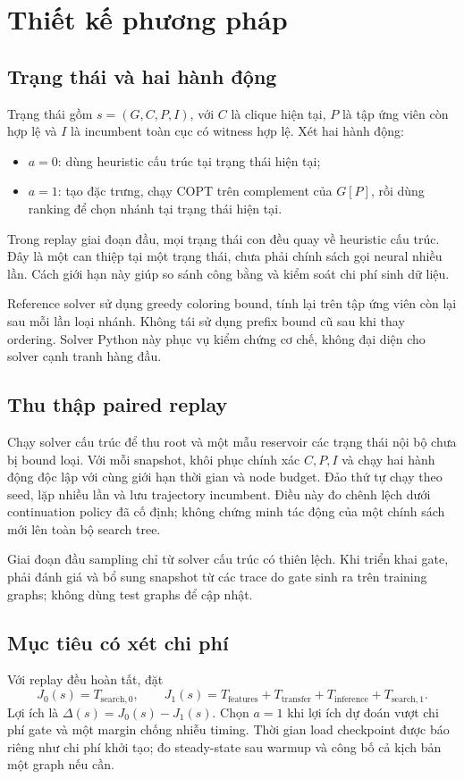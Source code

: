 \documentclass[11pt,a4paper]{article}
\begin{document}
\section{Thiết kế phương pháp}
\subsection{Trạng thái và hai hành động}
Trạng thái gồm $s=(G,C,P,I)$, với $C$ là clique hiện tại, $P$ là tập ứng viên còn hợp lệ và $I$ là incumbent toàn cục có witness hợp lệ. Xét hai hành động:
\begin{itemize}[nosep]
\item $a=0$: dùng heuristic cấu trúc tại trạng thái hiện tại;
\item $a=1$: tạo đặc trưng, chạy COPT trên complement của $G[P]$, rồi dùng ranking để chọn nhánh tại trạng thái hiện tại.
\end{itemize}
Trong replay giai đoạn đầu, mọi trạng thái con đều quay về heuristic cấu trúc. Đây là một can thiệp tại một trạng thái, chưa phải chính sách gọi neural nhiều lần. Cách giới hạn này giúp so sánh công bằng và kiểm soát chi phí sinh dữ liệu.

Reference solver sử dụng greedy coloring bound, tính lại trên tập ứng viên còn lại sau mỗi lần loại nhánh. Không tái sử dụng prefix bound cũ sau khi thay ordering. Solver Python này phục vụ kiểm chứng cơ chế, không đại diện cho solver cạnh tranh hàng đầu.

\subsection{Thu thập paired replay}
Chạy solver cấu trúc để thu root và một mẫu reservoir các trạng thái nội bộ chưa bị bound loại. Với mỗi snapshot, khôi phục chính xác $C,P,I$ và chạy hai hành động độc lập với cùng giới hạn thời gian và node budget. Đảo thứ tự chạy theo seed, lặp nhiều lần và lưu trajectory incumbent. Điều này đo chênh lệch dưới continuation policy đã cố định; không chứng minh tác động của một chính sách mới lên toàn bộ search tree.

Giai đoạn đầu sampling chỉ từ solver cấu trúc có thiên lệch. Khi triển khai gate, phải đánh giá và bổ sung snapshot từ các trace do gate sinh ra trên training graphs; không dùng test graphs để cập nhật.

\subsection{Mục tiêu có xét chi phí}
Với replay đều hoàn tất, đặt
\begin{equation}
J_0(s)=T_{\mathrm{search},0},\qquad
J_1(s)=T_{\mathrm{features}}+T_{\mathrm{transfer}}+T_{\mathrm{inference}}+T_{\mathrm{search},1}.
\end{equation}
Lợi ích là $\Delta(s)=J_0(s)-J_1(s)$. Chọn $a=1$ khi lợi ích dự đoán vượt chi phí gate và một margin chống nhiễu timing. Thời gian load checkpoint được báo riêng như chi phí khởi tạo; đo steady-state sau warmup và công bố cả kịch bản một graph nếu cần.
\end{document}
